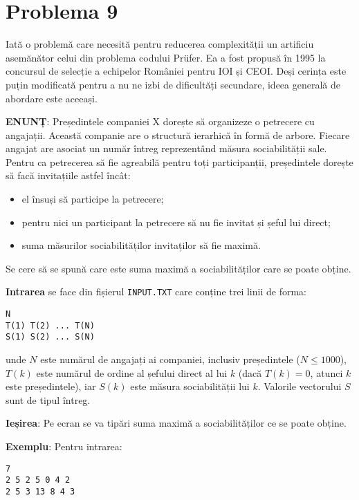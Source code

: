 \section{Problema 9}

Iată o problemă care necesită pentru reducerea complexității un artificiu
asemănător celui din problema codului Prüfer. Ea a fost propusă în 1995 la
concursul de selecție a echipelor României pentru IOI și CEOI. Deși cerința
este puțin modificată pentru a nu ne izbi de dificultăți secundare, ideea
generală de abordare este aceeași.

{\bf ENUNȚ}: Președintele companiei X dorește să organizeze o petrecere cu
angajații. Această companie are o structură ierarhică în formă de
arbore. Fiecare angajat are asociat un număr întreg reprezentând măsura
sociabilității sale. Pentru ca petrecerea să fie agreabilă pentru toți
participanții, președintele dorește să facă invitațiile astfel încât:

\begin{itemize}

\item el însuși să participe la petrecere;

\item pentru nici un participant la petrecere să nu fie invitat și șeful lui
  direct;

\item suma măsurilor sociabilităților invitaților să fie maximă.

\end{itemize}

Se cere să se spună care este suma maximă a sociabilităților care se poate obține.

{\bf Intrarea} se face din fișierul {\tt INPUT.TXT} care conține trei linii de
forma:

\begin{verbatim}
N
T(1) T(2) ... T(N)
S(1) S(2) ... S(N)
\end{verbatim}

unde $N$ este numărul de angajați ai companiei, inclusiv președintele ($N \leq
1000$), $T(k)$ este numărul de ordine al șefului direct al lui $k$ (dacă $T(k)
= 0$, atunci $k$ este președintele), iar $S(k)$ este măsura sociabilității lui
$k$. Valorile vectorului $S$ sunt de tipul întreg.

{\bf Ieșirea}: Pe ecran se va tipări suma maximă a sociabilităților ce se
poate obține.

{\bf Exemplu}: Pentru intrarea:

\begin{verbatim}
7
2 5 2 5 0 4 2
2 5 3 13 8 4 3
\end{verbatim}

